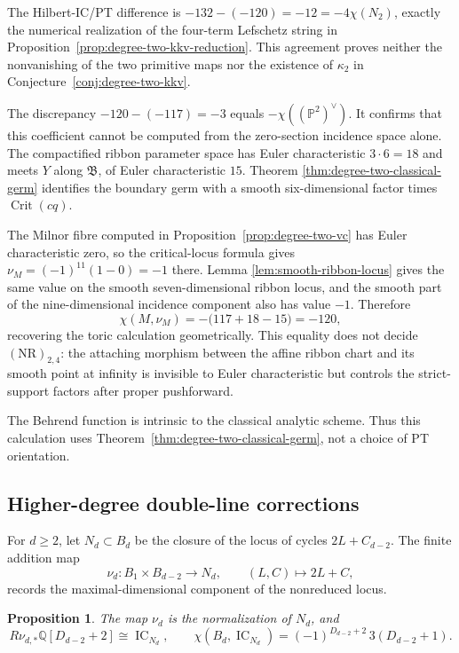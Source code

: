 \documentclass[11pt,reqno]{amsart}
\newtheorem{proposition}[theorem]{Proposition}
\theoremstyle{definition}
\newcommand{\Q}{\mathbb Q}
\newcommand{\Pp}{\mathbb P}
\newcommand{\IC}{\operatorname{IC}}
\begin{document}
The Hilbert-IC/PT difference is
$-132-(-120)=-12=-4\chi(N_2)$, exactly the numerical realization of the
four-term Lefschetz string in
Proposition~\ref{prop:degree-two-kkv-reduction}.  This agreement proves
neither the nonvanishing of the two primitive maps nor the existence of
$\kappa_2$ in Conjecture~\ref{conj:degree-two-kkv}.

The discrepancy $-120-(-117)=-3$ equals
$-\chi((\Pp^2)^\vee)$.  It confirms that this coefficient cannot be computed
from the zero-section incidence space alone.  The compactified ribbon
parameter space has Euler characteristic $3\cdot6=18$ and meets $Y$ along
$\mathfrak B$, of Euler characteristic $15$.  Theorem
\ref{thm:degree-two-classical-germ} identifies the boundary germ with a
smooth six-dimensional factor times $\operatorname{Crit}(cq)$.

The Milnor fibre computed in Proposition~\ref{prop:degree-two-vc} has Euler
characteristic zero, so the critical-locus formula gives
$\nu_M=(-1)^{11}(1-0)=-1$ there.  Lemma
\ref{lem:smooth-ribbon-locus} gives the same value on the smooth
seven-dimensional ribbon locus, and the smooth part of the
nine-dimensional incidence component also has value $-1$.  Therefore
\[
 \chi(M,\nu_M)=-\bigl(117+18-15\bigr)=-120,
\]
recovering the toric calculation geometrically.  This equality does not
decide $(\mathrm{NR})_{2,4}$: the attaching morphism between the affine
ribbon chart and its smooth point at infinity is invisible to Euler
characteristic but controls the strict-support factors after proper
pushforward.

The Behrend function is intrinsic to the classical analytic scheme.  Thus
this calculation uses Theorem~\ref{thm:degree-two-classical-germ}, not a
choice of PT orientation.

\subsection{Higher-degree double-line corrections}

For $d\ge2$, let $N_d\subset B_d$ be the closure of the locus of cycles
$2L+C_{d-2}$.  The finite addition map
\[
 \nu_d:B_1\times B_{d-2}\longrightarrow N_d,\qquad
 (L,C)\longmapsto2L+C,
\]
records the maximal-dimensional component of the nonreduced locus.

\begin{proposition}\label{prop:double-line-ic}
The map $\nu_d$ is the normalization of $N_d$, and
\begin{equation}\label{eq:double-line-ic}
 R\nu_{d,*}\Q[D_{d-2}+2]\cong\IC_{N_d},
 \qquad
 \chi(B_d,\IC_{N_d})
 =(-1)^{D_{d-2}+2}\,3(D_{d-2}+1).
\end{equation}
\end{proposition}
\end{document}
